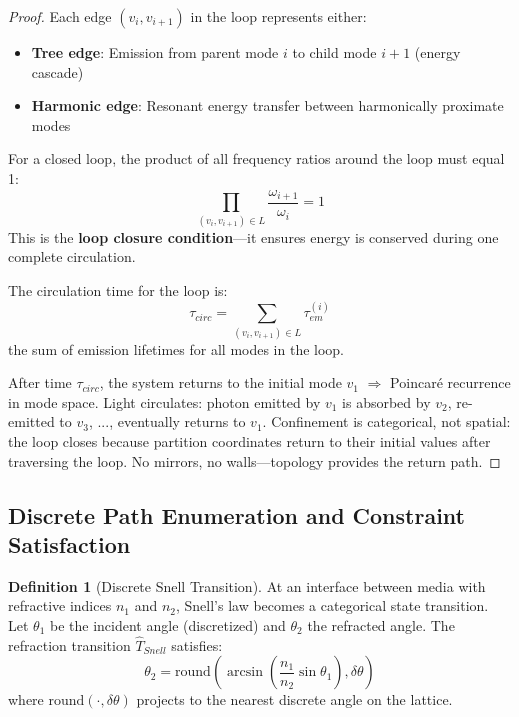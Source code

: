 \documentclass[11pt,a4paper]{article}
\theoremstyle{definition}
\newtheorem{definition}[theorem]{Definition}
\theoremstyle{remark}
\begin{document}
\begin{proof}
Each edge $(v_i, v_{i+1})$ in the loop represents either:
\begin{itemize}
\item \textbf{Tree edge}: Emission from parent mode $i$ to child mode $i+1$ (energy cascade)
\item \textbf{Harmonic edge}: Resonant energy transfer between harmonically proximate modes
\end{itemize}

For a closed loop, the product of all frequency ratios around the loop must equal 1:
\begin{equation}
\prod_{(v_i,v_{i+1})\in L} \frac{\omega_{i+1}}{\omega_i} = 1
\end{equation}
This is the \textbf{loop closure condition}—it ensures energy is conserved during one complete circulation.

The circulation time for the loop is:
\begin{equation}
\tau_{circ} = \sum_{(v_i,v_{i+1})\in L} \tau_{em}^{(i)}
\end{equation}
the sum of emission lifetimes for all modes in the loop.

After time $\tau_{circ}$, the system returns to the initial mode $v_1$ $\Rightarrow$ Poincaré recurrence in mode space. Light circulates: photon emitted by $v_1$ is absorbed by $v_2$, re-emitted to $v_3$, ..., eventually returns to $v_1$. Confinement is categorical, not spatial: the loop closes because partition coordinates return to their initial values after traversing the loop. No mirrors, no walls—topology provides the return path.
\end{proof}

\subsection{Discrete Path Enumeration and Constraint Satisfaction}

\begin{definition}[Discrete Snell Transition]
\label{def:discrete_snell}
At an interface between media with refractive indices $n_1$ and $n_2$, Snell's law becomes a categorical state transition. Let $\theta_1$ be the incident angle (discretized) and $\theta_2$ the refracted angle. The refraction transition $\hat{T}_{Snell}$ satisfies:
\begin{equation}
\theta_2 = \text{round}\left(\arcsin\left(\frac{n_1}{n_2}\sin\theta_1\right), \delta\theta\right)
\end{equation}
where $\text{round}(\cdot, \delta\theta)$ projects to the nearest discrete angle on the lattice.
\end{definition}
\end{document}

